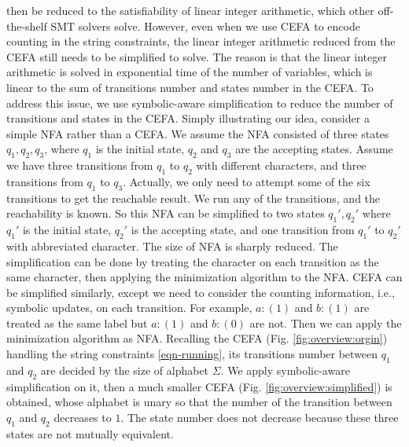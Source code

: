 {then be reduced to the satisfiability of linear integer arithmetic, which other off-the-shelf SMT solvers solve. \newline
However, even when we use CEFA to encode counting in the string constraints, the linear integer arithmetic reduced from the CEFA still needs to be simplified to solve. The reason is that the linear integer arithmetic is solved in exponential time of the number of variables, which is linear to the sum of transitions number and states number in the CEFA. To address this issue, we use symbolic-aware simplification to reduce the number of transitions and states in the CEFA. Simply illustrating our idea, consider a simple NFA rather than a CEFA. We assume the NFA consisted of three states $q_1, q_2, q_3$, where $q_1$ is the initial state, $q_2$ and $q_3$ are the accepting states. Assume we have three transitions from $q_1$ to $q_2$ with different characters, and three transitions from $q_1$ to $q_3$. Actually, we only need to attempt some of the six transitions to get the reachable result. We run any of the transitions, and the reachability is known. So this NFA can be simplified to two states $q_1', q_2'$ where $q_1'$ is the initial state, $q_2'$ is the accepting state, and one transition from $q_1'$ to $q_2'$ with abbreviated character. The size of NFA is sharply reduced. The simplification can be done by treating the character on each transition as the same character, then applying the minimization algorithm to the NFA. CEFA can be simplified similarly, except we need to consider the counting information, i.e., symbolic updates, on each transition. For example, $a:(1)$ and $b:(1)$ are treated as the same label but $a:(1)$ and $b:(0)$ are not. Then we can apply the minimization algorithm as NFA. Recalling the CEFA (Fig. \ref{fig:overview:orgin}) handling the string constraints \ref{eqn-running}, its transitions number between $q_1$ and $q_2$ are decided by the size of alphabet $\Sigma$. We apply symbolic-aware simplification on it, then a much smaller CEFA (Fig. \ref{fig:overview:simplified}) is obtained, whose alphabet is unary so that the number of the transition between $q_1$ and $q_2$ decreases to $1$. The state number does not decrease because these three states are not mutually equivalent. 

}
